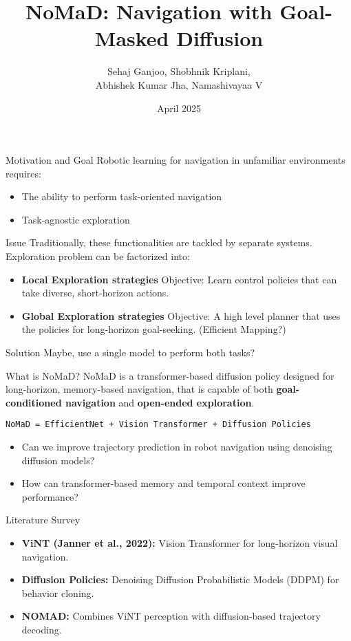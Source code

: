 \documentclass{beamer}
\title[NoMaD]{NoMaD: \textbf{N}avigati\textbf{o}n with Goal-\textbf{Ma}sked \textbf{D}iffusion}
\author{Sehaj Ganjoo, Shobhnik Kriplani, \\ Abhishek Kumar Jha, Namashivayaa V}
\institute{IISc Bengaluru \newline BTech. Mathematics and Computing}
\date{April 2025}
\begin{document}
\begin{frame}
\titlepage
\end{frame}

\begin{frame}{Motivation and Goal}
Robotic learning for navigation in unfamiliar environments requires:\\
\begin{itemize}
    \item The ability to perform task-oriented navigation
    \item Task-agnostic exploration 
\end{itemize}
\begin{block}{Issue}
    Traditionally, these functionalities are tackled by separate systems.
    Exploration problem can be factorized into:\\
    \begin{itemize}
        \item \textbf{Local Exploration strategies} Objective: Learn control policies that can take diverse, short-horizon actions.
        \item \textbf{Global Exploration strategies} Objective: A high level planner that uses the policies for long-horizon goal-seeking. (Efficient Mapping?)
    \end{itemize}
\end{block}
\begin{block}{Solution}
    Maybe, use a single model to perform both tasks?
\end{block}
\end{frame}
\begin{frame}{What is NoMaD?}
    NoMaD is a transformer-based diffusion policy designed for long-horizon, memory-based
    navigation, that is capable of both \textbf{goal-conditioned navigation} and \textbf{open-ended exploration}.

    \texttt{NoMaD = EfficientNet + Vision Transformer + Diffusion Policies}
\begin{itemize}
    \item Can we improve trajectory prediction in robot navigation using denoising diffusion models?
    \item How can transformer-based memory and temporal context improve performance?
\end{itemize}
\end{frame}

\begin{frame}{Literature Survey}
\begin{itemize}
    \item \textbf{ViNT (Janner et al., 2022):} Vision Transformer for long-horizon visual navigation.
    \item \textbf{Diffusion Policies:} Denoising Diffusion Probabilistic Models (DDPM) for behavior cloning.
    \item \textbf{NOMAD:} Combines ViNT perception with diffusion-based trajectory decoding.
\end{itemize}
\end{frame}
\end{document}
